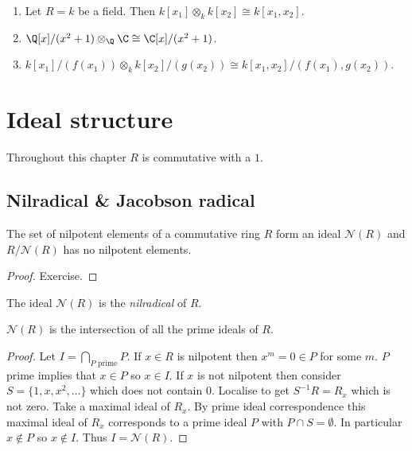 \documentclass[a4paper]{article}
\newcommand{\nilrad}[1]{\mathcal{N}({#1})} %
\begin{document}
\begin{eg}\leavevmode
  \begin{enumerate}
  \item Let \(R = k\) be a field. Then \(k[x_1] \otimes_k k[x_2] \cong k[x_1, x_2]\).
  \item \(\Q[x]/(x^2 + 1) \otimes_\Q \C \cong \C[x]/(x^2 + 1)\).
  \item \(k[x_1]/(f(x_1)) \otimes_k k[x_2]/(g(x_2)) \cong k[x_1, x_2]/(f(x_1), g(x_2))\).
  \end{enumerate}
\end{eg}

\section{Ideal structure}

Throughout this chapter \(R\) is commutative with a \(1\).

\subsection{Nilradical \& Jacobson radical}

\begin{lemma}
  The set of nilpotent elements of a commutative ring \(R\) form an ideal \(\mathcal N(R)\) and \(R/\nilrad R\) has no nilpotent elements.
\end{lemma}

\begin{proof}
  Exercise.
\end{proof}

\begin{definition}[nilradical]
  The ideal \(\nilrad R\) is the \emph{nilradical} of \(R\).
\end{definition}

\begin{lemma}[Krull]
  \(\nilrad R\) is the intersection of all the prime ideals of \(R\).
\end{lemma}

\begin{proof}
  Let \(I = \bigcap_{P \text{ prime}} P\). If \(x \in R\) is nilpotent then \(x^m = 0 \in P\) for some \(m\). \(P\) prime implies that \(x \in P\) so \(x \in I\). If \(x\) is not nilpotent then consider \(S = \{1, x, x^2, \dots\}\) which does not contain \(0\). Localise to get \(S^{-1}R = R_x\) which is not zero. Take a maximal ideal of \(R_x\). By prime ideal correspondence this maximal ideal of \(R_x\) corresponds to a prime ideal \(P\) with \(P \cap S = \emptyset\). In particular \(x \notin P\) so \(x \notin I\). Thus \(I = \nilrad R\).
\end{proof}
\end{document}
